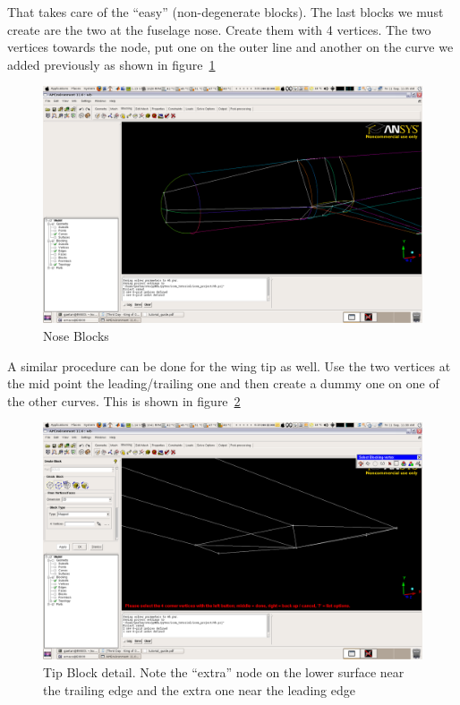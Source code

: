 \documentclass{report}
\begin{document}
That takes care of the ``easy'' (non-degenerate blocks). The last blocks we must create are the two at the fuselage nose. Create them with 4 vertices. The two vertices towards the node, put one on the outer line and another on the curve we added previously as shown in figure~\ref{fig:nose_blocks}


\begin{figure}[htb]
  \centering
  \includegraphics[width=\textwidth,angle=0]{figures/fig11.png}
  \caption{Nose Blocks}
  \label{fig:nose_blocks}
\end{figure}

A similar procedure can be done for the wing tip as well. Use the two vertices at the mid point the leading/trailing one and then create a dummy one on one of the other curves. This is shown in figure~\ref{fig:tip_blocks}

\begin{figure}[htb]
  \centering
  \includegraphics[width=\textwidth,angle=0]{figures/fig12.png}
  \caption{Tip Block detail. Note the ``extra'' node on the lower surface near the trailing edge and the extra one near the leading edge}
  \label{fig:tip_blocks}
\end{figure}
\end{document}
